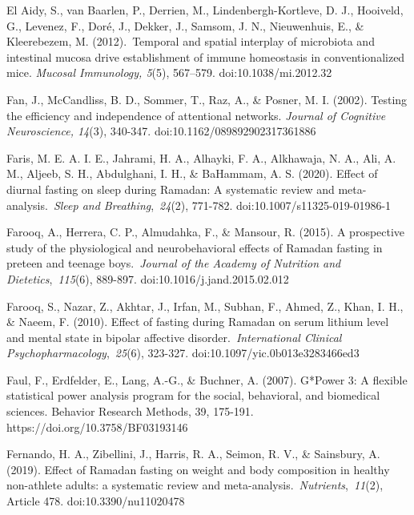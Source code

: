 \documentclass[authordate, empirical]{jote-new-article}
\begin{document}
El Aidy, S., van Baarlen, P., Derrien, M., Lindenbergh-Kortleve, D. J., Hooiveld, G., Levenez, F., Doré, J., Dekker, J., Samsom, J. N., Nieuwenhuis, E., \& Kleerebezem, M. (2012). Temporal and spatial interplay of microbiota and intestinal mucosa drive establishment of immune homeostasis in conventionalized mice.\emph{ Mucosal Immunology, 5}(5), 567--579. doi:10.1038/mi.2012.32



Fan, J., McCandliss, B. D., Sommer, T., Raz, A., \& Posner, M. I. (2002). Testing the efficiency and independence of attentional networks. \emph{Journal of Cognitive Neuroscience, 14}(3), 340-347. doi:10.1162/089892902317361886



Faris, M. E. A. I. E., Jahrami, H. A., Alhayki, F. A., Alkhawaja, N. A., Ali, A. M., Aljeeb, S. H., Abdulghani, I. H., \& BaHammam, A. S. (2020). Effect of diurnal fasting on sleep during Ramadan: A systematic review and meta-analysis. \emph{Sleep and Breathing}, \emph{24}(2), 771-782. doi:10.1007/s11325-019-01986-1



Farooq, A., Herrera, C. P., Almudahka, F., \& Mansour, R. (2015). A prospective study of the physiological and neurobehavioral effects of Ramadan fasting in preteen and teenage boys. \emph{Journal of the Academy of Nutrition and Dietetics}, \emph{115}(6), 889-897. doi:10.1016/j.jand.2015.02.012



Farooq, S., Nazar, Z., Akhtar, J., Irfan, M., Subhan, F., Ahmed, Z., Khan, I. H., \& Naeem, F. (2010). Effect of fasting during Ramadan on serum lithium level and mental state in bipolar affective disorder. \emph{International Clinical Psychopharmacology}, \emph{25}(6), 323-327. doi:10.1097/yic.0b013e3283466ed3



Faul, F., Erdfelder, E., Lang, A.-G., \& Buchner, A. (2007). G*Power 3: A flexible statistical power analysis program for the social, behavioral, and biomedical sciences. Behavior Research Methods, 39, 175-191. https://doi.org/10.3758/BF03193146



Fernando, H. A., Zibellini, J., Harris, R. A., Seimon, R. V., \& Sainsbury, A. (2019). Effect of Ramadan fasting on weight and body composition in healthy non-athlete adults: a systematic review and meta-analysis. \emph{Nutrients}, \emph{11}(2), Article 478. doi:10.3390/nu11020478
\end{document}

